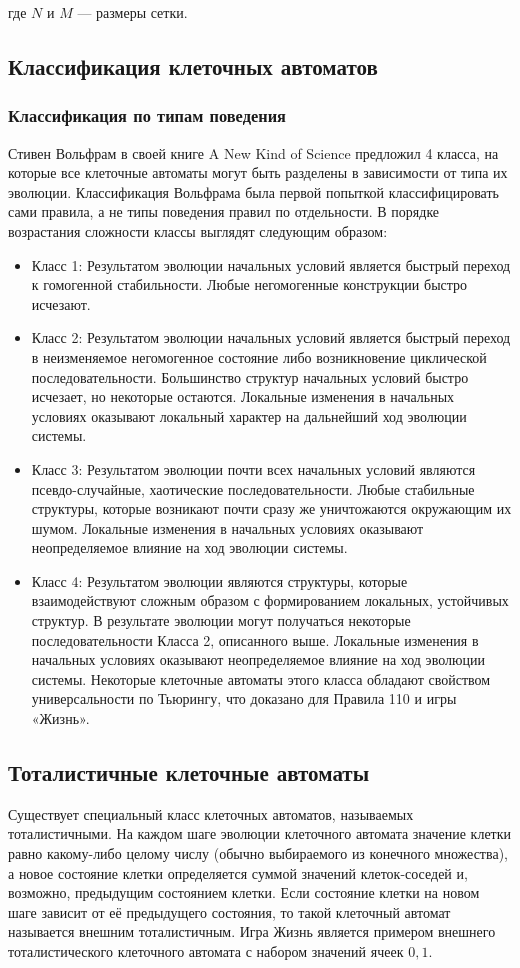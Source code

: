 \documentclass[a4paper, final]{article}
\begin{document}
где \(N\) и \(M\) — размеры сетки.

\subsection{Классификация клеточных автоматов}
\subsubsection{Классификация по типам поведения}
Стивен Вольфрам в своей книге A New Kind of Science предложил 4 класса, на которые 
все клеточные автоматы могут быть разделены в зависимости от типа их эволюции. 
Классификация Вольфрама была первой попыткой классифицировать сами правила, а не типы 
поведения правил по отдельности. В порядке возрастания сложности классы выглядят следующим 
образом:
\begin{itemize}
\item Класс 1: Результатом эволюции начальных условий является быстрый переход к гомогенной стабильности. Любые негомогенные конструкции быстро исчезают.
\item Класс 2: Результатом эволюции начальных условий является быстрый переход в неизменяемое негомогенное состояние либо возникновение циклической последовательности. Большинство структур начальных условий быстро исчезает, но некоторые остаются. Локальные изменения в начальных условиях оказывают локальный характер на дальнейший ход эволюции системы.
\item Класс 3: Результатом эволюции почти всех начальных условий являются псевдо-случайные, хаотические последовательности. Любые стабильные структуры, которые возникают почти сразу же уничтожаются окружающим их шумом. Локальные изменения в начальных условиях оказывают неопределяемое влияние на ход эволюции системы.
\item Класс 4: Результатом эволюции являются структуры, которые взаимодействуют сложным образом с формированием локальных, устойчивых структур. В результате эволюции могут получаться некоторые последовательности Класса 2, описанного выше. Локальные изменения в начальных условиях оказывают неопределяемое влияние на ход эволюции системы. Некоторые клеточные автоматы этого класса обладают свойством универсальности по Тьюрингу, что доказано для Правила 110 и игры «Жизнь».
\end{itemize}


\subsection{Тоталистичные клеточные автоматы}
Существует специальный класс клеточных автоматов, называемых тоталистичными. 
На каждом шаге эволюции клеточного автомата значение клетки равно какому-либо целому числу
(обычно выбираемого из конечного множества), а новое состояние клетки определяется суммой 
 значений клеток-соседей и, возможно, предыдущим состоянием клетки. Если состояние клетки на 
 новом шаге зависит от её предыдущего состояния, то такой клеточный автомат называется внешним 
 тоталистичным. Игра Жизнь является примером внешнего тоталистического клеточного автомата с 
 набором значений ячеек $0,1$.  
\end{document}
